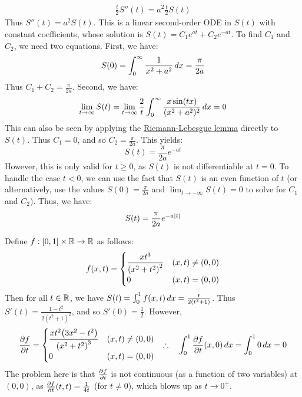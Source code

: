 \documentclass[main.tex]{subfiles}
\begin{document}
\begin{example}
    \begin{align*}
        \frac{t}{2}S''(t)
        = a^2\frac{t}{2}S(t)
    \end{align*}
    Thus $S''(t)=a^2S(t)$. This is a linear second-order ODE in $S(t)$ with constant coefficients, whose solution is $S(t)=C_1e^{at}+C_2e^{-at}$. To find $C_1$ and $C_2$, we need two equations. First, we have:
    \begin{equation*}
        S(0)
        = \int_0^\infty \frac{1}{x^2+a^2}\,dx
        = \frac{\pi}{2a}
    \end{equation*}
    Thus $C_1+C_2=\frac{\pi}{2a}$. Second, we have:
    \begin{equation*}
        \lim_{t\to\infty} S(t)
        = \lim_{t\to\infty} \frac{2}{t}\int_0^\infty \frac{x\sin(tx)}{(x^2+a^2)^2}\,dx
        = 0
    \end{equation*}
    This can also be seen by applying the \href{https://en.wikipedia.org/wiki/Riemann%E2%80%93Lebesgue_lemma}{Riemann-Lebesgue lemma} directly to $S(t)$. Thus $C_1=0$, and so $C_2=\frac{\pi}{2a}$. This yields:
    \begin{equation*}
        S(t) = \frac{\pi}{2a}e^{-at} \tag{$t\ge 0$}
    \end{equation*}
    However, this is only valid for $t\ge 0$, as $S(t)$ is not differentiable at $t=0$. To handle the case $t<0$, we can use the fact that $S(t)$ is an even function of $t$ (or alternatively, use the values $S(0)=\frac{\pi}{2a}$ and $\lim_{t\to-\infty} S(t)=0$ to solve for $C_1$ and $C_2$). Thus, we have:
    \begin{equation*}
        S(t) = \frac{\pi}{2a}e^{-a\abs{t}}
    \end{equation*}
\end{example}

\begin{example}
    Define $f:[0,1]\times\R\to\R$ as follows:
    \begin{equation*}
        f(x,t) = \begin{cases}
            \dfrac{xt^3}{\qty(x^2+t^2)^2} & (x,t)\ne(0,0) \\
            0 & (x,t)=(0,0)
        \end{cases}
    \end{equation*}
    Then for all $t\in\R$, we have $S(t)=\int_0^1 f(x,t)\,dx=\frac{t}{2(t^2+1)}$. Thus $S'(t)=\frac{1-t^2}{2(t^2+1)^2}$, and so $S'(0)=\frac{1}{2}$. However,
    \begin{align*}
        \pdv{f}{t}(x,t) = \begin{cases}
            \dfrac{xt^2\qty(3x^2-t^2)}{\qty(x^2+t^2)^3} & (x,t)\ne(0,0) \\
            0 & (x,t)=(0,0)
        \end{cases}
        &&\therefore\quad
        \int_0^1 \pdv{f}{t}\/(x,0)\,dx=\int_0^1 0\,dx=0
    \end{align*}
    The problem here is that $\pdv{f}{t}$ is not continuous (as a function of two variables) at $(0,0)$, as $\pdv{f}{t}\/(t,t)=\frac{1}{4t}$ (for $t\ne0$), which blows up as $t\to0^+$.
\end{example}
\end{document}
